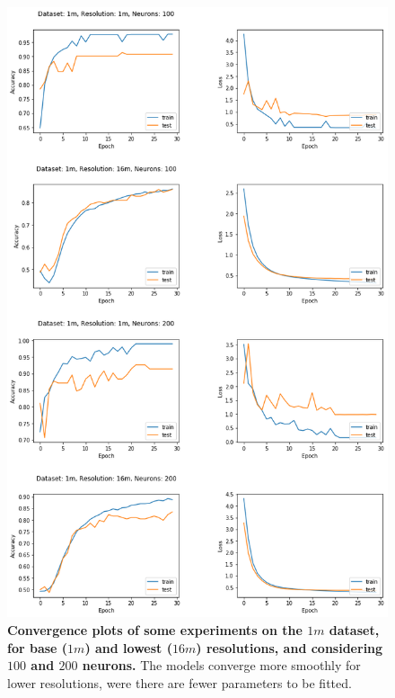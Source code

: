 \begin{figure}[h!]
	\centering
	\includegraphics[width=\textwidth]{Figures/results/convergence_plots_1m.png}
	\captionsetup{width=1\linewidth}
	\caption{\textbf{Convergence plots of some experiments on the $1m$ dataset, for base ($1m$) and lowest ($16m$) resolutions, and considering $100$ and $200$ neurons.} The models converge more smoothly for lower resolutions, were there are fewer parameters to be fitted.}
	\label{fig:conv_plots_1m}
\end{figure}
